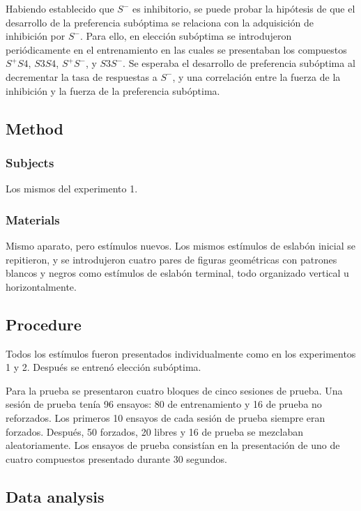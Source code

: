 \documentclass[a4paper,12pt]{article}
\begin{document}
Habiendo establecido que $S^{-}$ es inhibitorio, se puede probar la hipótesis de que el desarrollo de la preferencia subóptima se relaciona con la adquisición de inhibición por $S^{-}$.
Para ello, en elección subóptima se introdujeron periódicamente en el entrenamiento en las cuales se presentaban los compuestos $S^{+}S4$, $S3S4$, $S^{+}S^{-}$, y $S3S^{-}$.
Se esperaba el desarrollo de preferencia subóptima al decrementar la tasa de respuestas a $S^{-}$, y una correlación entre la fuerza de la inhibición y la fuerza de la preferencia subóptima.

\subsection{Method}

\subsubsection{Subjects}

Los mismos del experimento 1.

\subsubsection{Materials}

Mismo aparato, pero estímulos nuevos.
Los mismos estímulos de eslabón inicial se repitieron, y se introdujeron cuatro pares de figuras geométricas con patrones blancos y negros como estímulos de eslabón terminal, todo organizado vertical u horizontalmente.

\subsection{Procedure}

Todos los estímulos fueron presentados individualmente como en los experimentos 1 y 2.
Después se entrenó elección subóptima.

Para la prueba se presentaron cuatro bloques de cinco sesiones de prueba.
Una sesión de prueba tenía 96 ensayos: 80 de entrenamiento y 16 de prueba no reforzados.
Los primeros 10 ensayos de cada sesión de prueba siempre eran forzados. Después, 50 forzados, 20 libres y 16 de prueba se mezclaban aleatoriamente.
Los ensayos de prueba consistían en la presentación de uno de cuatro compuestos presentado durante 30 segundos.

\subsection{Data analysis}
\end{document}
